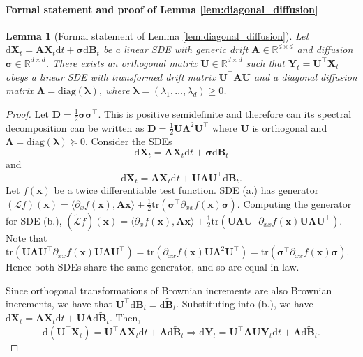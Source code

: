 \documentclass{article}
\newcommand{\diff}{\mathrm{d}}
\newcommand{\tr}{\mathrm{tr}}
\theoremstyle{newstyle}
\newtheorem*{mylem}{Lemma}
\begin{document}
\paragraph{Formal statement and proof of Lemma \ref{lem:diagonal_diffusion}}
\begin{mylem}[Formal statement of Lemma \ref{lem:diagonal_diffusion}]
  Let $\diff \bm{X}_t = \bm{A} \bm{X}_t \diff t + \bm{\sigma} \diff \bm{B}_t$ be a linear SDE with generic drift $\bm{A} \in \mathbb{R}^{d \times d}$ and diffusion $\bm{\sigma} \in \mathbb{R}^{d \times d}$. There exists an orthogonal matrix $\bm{U} \in \mathbb{R}^{d \times d}$ such that $\bm{Y}_t = \bm{U}^\top \bm{X}_t$ obeys a linear SDE with transformed drift matrix $\bm{U}^\top \bm{A} \bm{U}$ and a diagonal diffusion matrix $\bm{\Lambda} = \mathrm{diag}(\bm{\lambda})$, where $\bm{\lambda} = (\lambda_1, \ldots, \lambda_d) \ge 0$. 
\end{mylem}
  
\begin{proof}
Let $\bm{D} = \frac{1}{2} \bm{\sigma} \bm{\sigma}^\top$. This is positive semidefinite and therefore can its spectral decomposition can be written as $\bm{D} = \frac{1}{2} \bm{U} \bm{\Lambda}^2 \bm{U}^\top$ where $\bm{U}$ is orthogonal and $\bm{\Lambda} = \mathrm{diag}(\bm{\lambda}) \succeq 0$. Consider the SDEs
\[
  \diff \bm{X}_t = \bm{A} \bm{X}_t \diff t + \bm{\sigma} \diff \bm{B}_t \tag{a.}
\]
and
\[
  \diff \bm{X}_t = \bm{A} \bm{X}_t \diff t + \bm{U} \bm{\Lambda} \bm{U}^\top \diff \bm{B}_t. \tag{b.}
\]
Let $f(\bm{x})$ be a twice differentiable test function. SDE (a.) has generator $(\mathcal{L} f)(\bm{x}) = \langle \partial_x f(\bm{x}), \bm{A}\bm{x} \rangle + \frac{1}{2} \tr(\bm{\sigma}^\top \partial_{xx} f(\bm{x}) \bm{\sigma})$. 
Computing the generator for SDE (b.),
$(\tilde{\mathcal{L}} f)(\bm{x}) = \langle \partial_x f(\bm{x}), \bm{A}\bm{x} \rangle + \frac{1}{2} \tr( \bm{U} \bm{\Lambda} \bm{U}^\top \partial_{xx} f(\bm{x}) \bm{U} \bm{\Lambda} \bm{U}^\top)$.
Note that $\tr( \bm{U} \bm{\Lambda} \bm{U}^\top \partial_{xx} f(\bm{x}) \bm{U} \bm{\Lambda} \bm{U}^\top) = \tr(\partial_{xx} f(\bm{x}) \bm{U} \bm{\Lambda}^2 \bm{U}^\top) = \tr(\bm{\sigma}^\top \partial_{xx} f(\bm{x}) \bm{\sigma})$. 
Hence both SDEs share the same generator, and so are equal in law. 

Since orthogonal transformations of Brownian increments are also Brownian increments, we have that $\bm{U}^\top \diff \bm{B}_t = \diff \tilde{\bm{B}}_t$. Substituting into (b.), we have $\diff \bm{X}_t = \bm{A} \bm{X}_t \diff t + \bm{U} \bm{\Lambda} \diff \tilde{\bm{B}}_t$. Then,
$$ \diff (\bm{U}^\top \bm{X}_t) = \bm{U}^\top \bm{A} \bm{X}_t \diff t + \bm{\Lambda} \diff \tilde{\bm{B}}_t \Longrightarrow \diff \bm{Y}_t = \bm{U}^\top \bm{A} \bm{U} \bm{Y}_t \diff t + \bm{\Lambda} \diff \tilde{\bm{B}}_t.$$
\end{proof}
  
\end{document}
